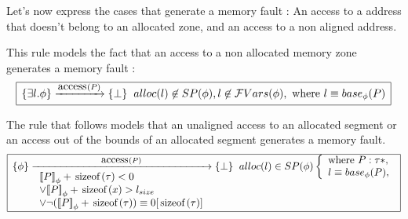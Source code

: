 \documentclass[a4paper,twoside,12pt]{report}
\newcommand{\Sp}[1]{SP(#1)} %
\newcommand{\Alloc}[1]{alloc(#1)}
\newcommand{\FVars}[1]{\mathcal{F}Vars(#1)}
\newcommand{\base}[2]{base_{#1}(#2)}
\newcommand{\lsize}[1]{#1_{size}}
\newcommand{\transmodel}[4]{\lbrace #1 \rbrace \arrow{#2}{#3} \lbrace #4 \rbrace }
\newcommand{\seq}[0]{\equiv} %
\newcommand{\congmod}[3]{#1 \equiv #2 \lbrack #3 \rbrack}
\newcommand{\interpa}[2]{\sem{#2}_{#1}}
\newcommand{\sizeof}[1]{\mbox{\lstinline!sizeof!}(#1)}
\newcommand{\accs}[1]{\mbox{\lstinline!access!}(#1)}
\begin{document}
Let's now express the cases that generate a memory fault :
An access to a address that doesn't belong to an allocated zone, and
an access to a non aligned address.

This rule models the fact that an access to a non allocated memory zone generates a memory fault :
$$
\begin{array}{|l|}
\hline
\transmodel{\exists l. \phi}{\accs{P}}{}{\bot} \gspace  \Alloc{l}\not \in \Sp{\phi}, l\not\in \FVars{\phi}, \mbox{ where } l \seq \base{\phi}{P} \\
\hline
\end{array}
$$

The rule that follows models that an unaligned access to an allocated segment
or an access out of the bounds of an allocated segment generates a memory fault.
$$
\begin{array}{|l|}
\hline
\transmodel{\phi}{\accs{P}}{
\begin{array}{l}
\interpa{\phi}{P}+\sizeof{\tau}< 0  \\ 
\vee  \interpa{\phi}{P}+\sizeof{x} > \lsize{l} \\
\vee \neg \congmod{(\interpa{\phi}{P}+\sizeof{\tau})}{0}{\sizeof{\tau}}
\end{array}
}{\bot} \gspace \Alloc{l}\in \Sp{\phi} \left \lbrace  \begin{array}{l} \mbox{where } P:\tau *,\\ l\seq\base{\phi}{P},\\ \end{array} \right . \\
\hline
\end{array}
$$
\end{document}
